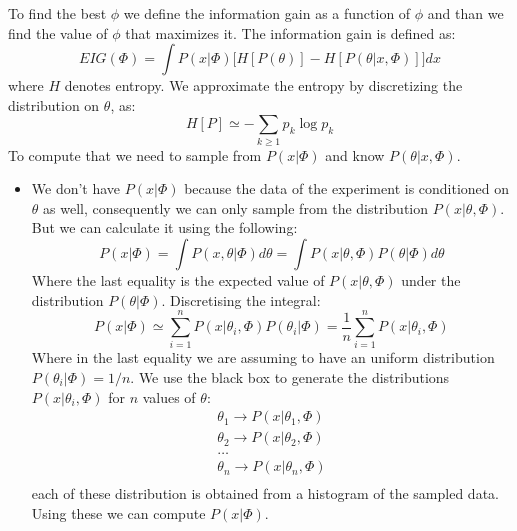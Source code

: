 \documentclass[10pt,journal,compsoc]{IEEEtran}
\begin{document}
To find the best $\phi$ we define the information gain as a function of $\phi$ and than we find the value of $\phi$ that maximizes it. The information gain is defined as:
\begin{equation}\label{infGain}
EIG(\Phi) =\int P(x|\Phi)\Big[ H[P(\theta)]-H[P(\theta|x,\Phi)]\Big]dx
\end{equation}
where $H$ denotes entropy. We approximate the entropy by discretizing the distribution on $\theta$, as:
\begin{equation}
H[P]\simeq-\sum_{k\geq 1}p_k \log{p_k}
\end{equation}
To compute that we need to sample from $ P(x|\Phi)$ and know $P(\theta|x,\Phi)$.
\begin{itemize}
\item We don't have $P(x|\Phi)$ because the data of the experiment is conditioned on $\theta$ as well, consequently we can only sample from the distribution $P(x |\theta,\Phi)$. But we can calculate it using the following:
\begin{equation}
P(x|\Phi) = \int P(x,\theta | \Phi)d \theta = 
\int P(x| \theta , \Phi) P(\theta | \Phi)d \theta 
\end{equation}
Where the last equality is the expected value of $P(x| \theta , \Phi)$ under the distribution $P(\theta | \Phi)$.
Discretising the integral:
\begin{equation}
P(x|\Phi) \simeq \sum_{i=1}^{n}  P(x |\theta_i,\Phi)P(\theta_i | \Phi) = \frac{1}{n} \sum_{i=1}^{n}  P(x |\theta_i,\Phi) 
\end{equation}
Where in the last equality we are assuming to have an uniform distribution $P(\theta_i | \Phi) =1/n$.
We use the black box to generate the distributions $P(x |\theta_i,\Phi) $ for $n$ values of $\theta$:
\begin{equation}
\begin{array}{ll}
\theta_1 \rightarrow P(x |\theta_1,\Phi)\\
\theta_2 \rightarrow P(x |\theta_2,\Phi)\\
\dots\\
\theta_n \rightarrow P(x |\theta_n,\Phi)\\
\end{array}
\end{equation}
each of these distribution is obtained from a histogram of the sampled data.
Using these we can compute $P(x|\Phi)$. \\


\end{itemize}
\end{document}
